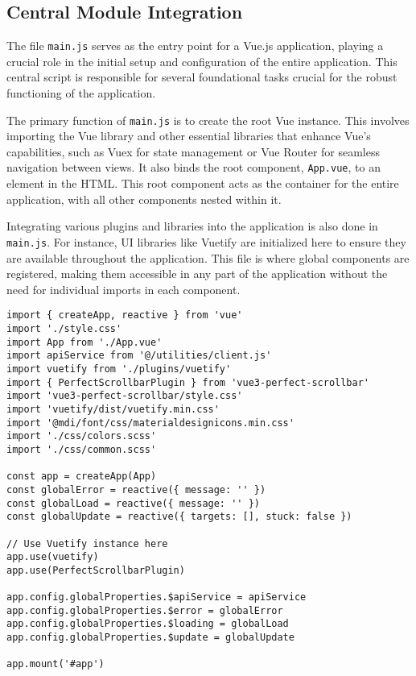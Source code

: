 \subsection{Central Module Integration}
\label{implementation:centralmodule}

The file \texttt{main.js} serves as the entry point for a Vue.js application, playing a crucial role in the initial setup and configuration of the entire application. This central script is responsible for several foundational tasks crucial for the robust functioning of the application.

The primary function of \texttt{main.js} is to create the root Vue instance. This involves importing the Vue library and other essential libraries that enhance Vue's capabilities, such as Vuex for state management or Vue Router for seamless navigation between views. It also binds the root component, \texttt{App.vue}, to an element in the HTML. This root component acts as the container for the entire application, with all other components nested within it.

Integrating various plugins and libraries into the application is also done in \texttt{main.js}. For instance, UI libraries like Vuetify are initialized here to ensure they are available throughout the application. This file is where global components are registered, making them accessible in any part of the application without the need for individual imports in each component.

\begin{clisting}
\label{list:mainjs}
\begin{verbatim}
import { createApp, reactive } from 'vue'
import './style.css'
import App from './App.vue'
import apiService from '@/utilities/client.js'
import vuetify from './plugins/vuetify'
import { PerfectScrollbarPlugin } from 'vue3-perfect-scrollbar'
import 'vue3-perfect-scrollbar/style.css'
import 'vuetify/dist/vuetify.min.css'
import '@mdi/font/css/materialdesignicons.min.css'
import './css/colors.scss'
import './css/common.scss'

const app = createApp(App)
const globalError = reactive({ message: '' })
const globalLoad = reactive({ message: '' })
const globalUpdate = reactive({ targets: [], stuck: false })

// Use Vuetify instance here
app.use(vuetify)
app.use(PerfectScrollbarPlugin)

app.config.globalProperties.$apiService = apiService
app.config.globalProperties.$error = globalError
app.config.globalProperties.$loading = globalLoad
app.config.globalProperties.$update = globalUpdate

app.mount('#app')
\end{verbatim}
\end{clisting}

